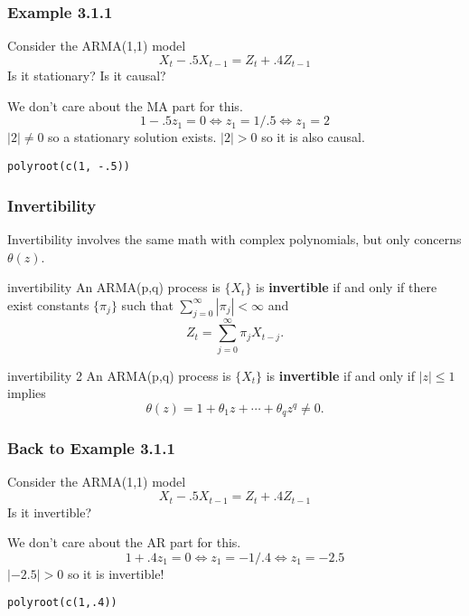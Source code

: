 \documentclass{beamer}
\begin{document}

\begin{frame}[fragile]
\frametitle{Example 3.1.1}
Consider the ARMA(1,1) model 
\[
X_t - .5 X_{t-1} = Z_t + .4 Z_{t-1}
\]
Is it stationary? Is it causal?
\pause
\newline

We don't care about the MA part for this.
\[
1 - .5 z_1 = 0 \iff z_1 = 1/.5 \iff z_1 = 2
\]
$|2| \neq 0$ so a stationary solution exists. $|2| > 0$ so it is also causal. 

\begin{verbatim}
polyroot(c(1, -.5))
\end{verbatim}

\end{frame}


\begin{frame}
\frametitle{Invertibility}

Invertibility involves the same math with complex polynomials, but only concerns $\theta(z)$.
\newline

\begin{block}{invertibility}
An ARMA(p,q) process is $\{X_t\}$ is {\bf invertible} if and only if there exist constants $\{\pi_j\}$ such that $\sum_{j=0}^{\infty}|\pi_j| < \infty$ and 
\[
Z_t = \sum_{j=0}^{\infty}\pi_j X_{t-j}.
\]
\end{block}
\begin{block}{invertibility 2}
An ARMA(p,q) process is $\{X_t\}$ is {\bf invertible} if and only if $|z| \le 1$ implies
\[
\theta(z) = 1 + \theta_1 z + \cdots + \theta_q z^q \neq 0.
\]
\end{block}

\end{frame}

\begin{frame}[fragile]
\frametitle{Back to Example 3.1.1}
Consider the ARMA(1,1) model 
\[
X_t - .5 X_{t-1} = Z_t + .4 Z_{t-1}
\]
Is it invertible?
\pause
\newline

We don't care about the AR part for this.
\[
1 + .4 z_1 = 0 \iff z_1 = -1/.4 \iff z_1 = -2.5
\]
$|-2.5| > 0$ so it is invertible! 

\begin{verbatim}
polyroot(c(1,.4))
\end{verbatim}


\end{frame}
\end{document}
